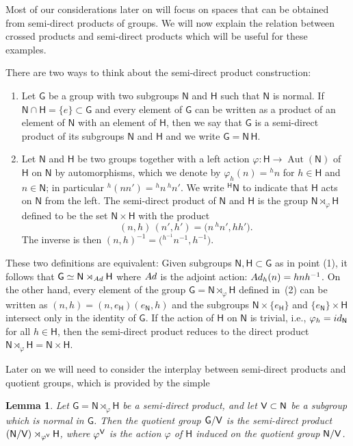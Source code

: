 \documentclass[11pt]{article}
\numberwithin{equation}{section}
\numberwithin{equation}{section}
\def\V{{\sf V}}
\newcommand{\sfG}{\mathsf{G}}
\newcommand{\sfH}{\mathsf{H}}
\newcommand{\sfN}{\mathsf{N}}
\newcommand{\Aut}{\operatorname{Aut}}
\newtheorem{Lemma}[Theorem]{Lemma}
\begin{document}
Most of our considerations later on will focus on spaces that can be
obtained from semi-direct products of groups. We will now explain the
relation between crossed products and semi-direct products which will
be useful for these examples.

There are two ways to think about the semi-direct product construction:
\begin{enumerate}\itemsep=0pt
\item[(1)] Let $\sfG$ be a
group with two subgroups $\sfN $ and $\sfH$ such that $\sfN $ is normal. If $\sfN \cap
\sfH=\{e\}\subset \sfG$ and every
element of $\sfG$ can be written as a product of an element of
$\sfN $ with an element of $\sfH$, then we say that $\sfG$ is a semi-direct
product of its subgroups $\sfN $ and $\sfH$ and we write $\sfG=\sfN \,\sfH$.

\item[(2)]
Let $\sfN $ and $\sfH$ be two groups together with a left action
$\varphi\colon \sfH\to\Aut(\sfN )$ of $\sfH$ on $\sfN $ by automorphisms, which we denote by
$\varphi_h(n)={}^hn$ for $h\in \sfH$ and $n\in \sfN $; in particular
${}^h(n n')={}^hn\, {}^hn'$. We write ${}^\sfH \sfN $ to
indicate that $\sfH $ acts on $\sfN $ from the left. The semi-direct product
of $\sfN $ and $\sfH $ is the group $\sfN \rtimes_\varphi \sfH $ defined to be the set
$\sfN \times \sfH $ with the product
\[
(n,h)\,(n',h') = \big(n\,{}^hn',h h'\big) .
\]
The inverse is then $(n,h)^{-1}=\big({}^{h^{-1\!}}{n^{-1}},h^{-1}\big)$.
\end{enumerate}
These two definitions are equivalent: Given subgroups $\sfN ,\sfH \subset \sfG$ as
in point (1), it follows that $\sfG\simeq \sfN \rtimes_{\rm Ad} \sfH $
where ${\rm Ad}$ is the adjoint action: ${\rm Ad}_h(n)=h n h^{-1}$. On the other
hand, every element of the group $\sfG=\sfN \rtimes_\varphi \sfH $ defined in~(2) can be written as $(n,h)=(n,e_\sfH) (e_\sfN,h)$ and the subgroups $\sfN \times\{e_\sfH\}$
and $\{e_\sfN\} \times \sfH $ intersect only in the identity of $\sfG$.
If the action of $\sfH $ on $\sfN $ is trivial,
i.e., $\varphi_h={\rm id}_\sfN $ for all $h\in \sfH $, then the semi-direct
product reduces to the direct product $\sfN \rtimes_\varphi
\sfH =\sfN \times \sfH $.

Later on we will need to consider the interplay between semi-direct
products and quotient groups, which is provided by the simple
\begin{Lemma}
\label{lem:semidirectquotient}
Let $\sfG=\sfN\rtimes_\varphi\sfH$ be a semi-direct
product, and let $\V\subset \sfN$ be a subgroup which is normal in
$\sfG$. Then the quotient group $\sfG/\V$ is the
semi-direct product $(\sfN/\V)\rtimes_{\varphi^\V}\sfH$, where
${\varphi^\V}$ is the action $\varphi$ of $\sfH$ induced on the
quotient group $\sfN/\V$.
\end{Lemma}
\end{document}

